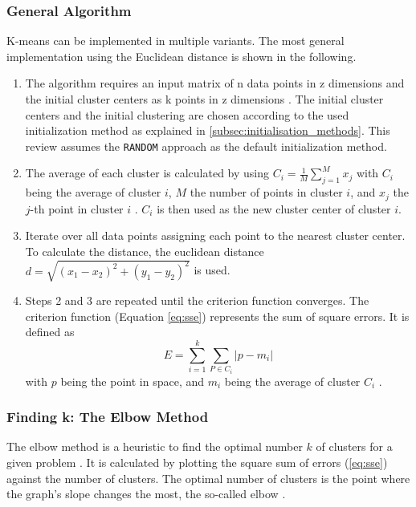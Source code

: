 \subsubsection{General Algorithm}
\label{subsec:general_algorithm}
K-means can be implemented in multiple variants.
The most general implementation using the Euclidean distance is shown in the following.
\begin{enumerate}
    \item The algorithm requires an input matrix of n data points in z dimensions and the initial cluster centers as k points in z dimensions \cite{HAR-KMA}.
          The initial cluster centers and the initial clustering are chosen according to the used initialization method as explained in \ref{subsec:initialisation_methods}.
          This review assumes the \texttt{RANDOM} approach as the default initialization method.
    \item The average of each cluster is calculated by using $C_i = \frac{1}{M} \sum_{j=1}^{M}x_j$ with $C_i$ being the average of cluster $i$, $M$ the number of points in cluster $i$, and $x_j$ the $j$-th point in cluster $i$ \cite{SYA-IKC}.
          $C_i$ is then used as the new cluster center of cluster $i$.
    \item Iterate over all data points assigning each point to the nearest cluster center.
          To calculate the distance, the euclidean distance $d = \sqrt{(x_1-x_2)^2+(y_1-y_2)^2}$ is used.
    \item Steps 2 and 3 are repeated until the criterion function converges.
          The criterion function (Equation \ref{eq:sse}) represents the sum of square errors.
          It is defined as \begin{equation}\label{eq:sse}E=\sum_{i=1}^{k} \sum_{P \in C_i}|p-m_i|\end{equation} with $p$ being the point in space, and $m_i$ being the average of cluster $C_i$ \cite{LIU-BDE}.
\end{enumerate}

\subsubsection{Finding k: The Elbow Method}
The elbow method is a heuristic to find the optimal number $k$ of clusters for a given problem \cite{SYA-IKC}.
It is calculated by plotting the square sum of errors (\ref{eq:sse}) against the number of clusters.
The optimal number of clusters is the point where the graph's slope changes the most, the so-called elbow \cite{SYA-IKC}.

